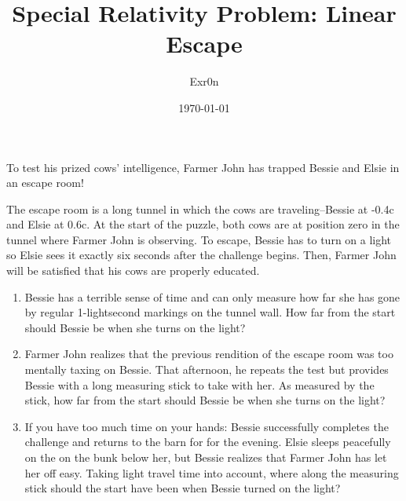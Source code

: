 \documentclass[letterpaper]{article}
\author{Exr0n}
\date{\today}
\title{Special Relativity Problem: Linear Escape}
\renewcommand\maketitle{}
\begin{document}
\maketitle
To test his prized cows' intelligence, Farmer John has trapped Bessie and Elsie in an escape room!

The escape room is a long tunnel in which the cows are traveling--Bessie at -0.4c and Elsie at 0.6c. At the start of the puzzle, both cows are at position zero in the tunnel where Farmer John is observing. To escape, Bessie has to turn on a light so Elsie sees it exactly six seconds after the challenge begins. Then, Farmer John will be satisfied that his cows are properly educated.

\begin{enumerate}
\item Bessie has a terrible sense of time and can only measure how far she has gone by regular 1-lightsecond markings on the tunnel wall. How far from the start should Bessie be when she turns on the light?

\item Farmer John realizes that the previous rendition of the escape room was too mentally taxing on Bessie. That afternoon, he repeats the test but provides Bessie with a long measuring stick to take with her. As measured by the stick, how far from the start should Bessie be when she turns on the light?

\item If you have too much time on your hands: Bessie successfully completes the challenge and returns to the barn for for the evening. Elsie sleeps peacefully on the on the bunk below her, but Bessie realizes that Farmer John has let her off easy. Taking light travel time into account, where along the measuring stick should the start have been when Bessie turned on the light?
\end{enumerate}
\end{document}
